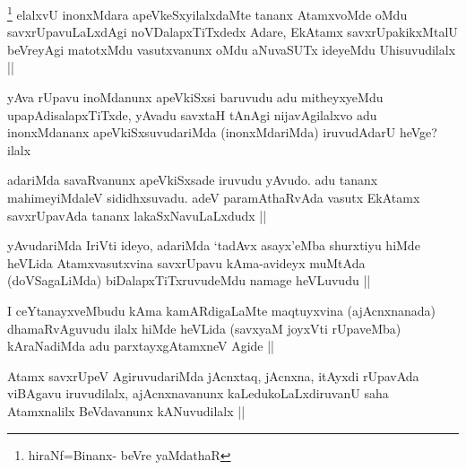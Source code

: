 
\begin{artha}
\footnote{hiraNf=Binanx- beVre yaMdathaR}
elalxvU inonxMdara apeVkeSxyilalxdaMte tananx AtamxvoMde oMdu savxrUpavuLaLxdAgi noVDalapxTiTxdedx Adare, EkAtamx savxrUpakikxMtalU beVreyAgi matotxMdu vasutxvanunx oMdu aNuvaSUTx ideyeMdu Uhisuvudilalx ||
\end{artha}


\begin{artha}
yAva rUpavu inoMdanunx apeVkiSxsi baruvudu adu mitheyxyeMdu upapAdisalapxTiTxde, yAvadu savxtaH tAnAgi nijavAgilalxvo adu inonxMdananx apeVkiSxsuvudariMda (inonxMdariMda) iruvudAdarU heVge? ilalx
\end{artha}

\begin{artha}
adariMda savaRvanunx apeVkiSxsade iruvudu yAvudo. adu tananx mahimeyiMdaleV sididhxsuvadu. adeV paramAthaRvAda vasutx EkAtamx savxrUpavAda tananx lakaSxNavuLaLxdudx ||
\end{artha}

\begin{artha}
yAvudariMda IriVti ideyo, adariMda `tadAvx asayx'eMba shurxtiyu hiMde heVLida Atamxvasutxvina savxrUpavu kAma-avideyx muMtAda (doVSagaLiMda) biDalapxTiTxruvudeMdu namage heVLuvudu ||
\end{artha}


\begin{artha}
I ceYtanayxveMbudu kAma kamARdigaLaMte maqtuyxvina (ajAcnxnanada) dhamaRvAguvudu ilalx hiMde heVLida (savxyaM joyxVti rUpaveMba) kAraNadiMda adu parxtayxgAtamxneV Agide ||
\end{artha}


\begin{artha}
Atamx savxrUpeV AgiruvudariMda jAcnxtaq, jAcnxna, itAyxdi rUpavAda viBAgavu iruvudilalx, ajAcnxnavanunx kaLedukoLaLxdiruvanU saha Atamxnalilx BeVdavanunx kANuvudilalx ||
\end{artha}


